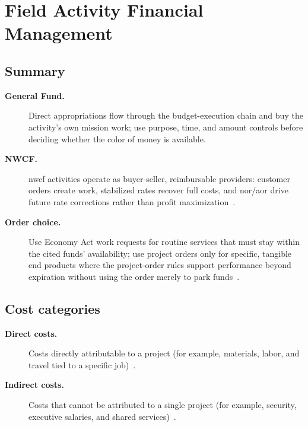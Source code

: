 \documentclass[../main.tex]{subfiles}
\begin{document}
\section{Field Activity Financial Management}

\subsection{Summary}
\begin{description}
  \item[\textbf{General Fund.}] Direct appropriations flow through the budget-execution chain and buy the activity's own
  mission work; use purpose, time, and amount controls before deciding whether the color of money is available.
  \item[\textbf{NWCF.}] \ac{nwcf} activities operate as buyer-seller, reimbursable providers: customer orders create work,
  stabilized rates recover full costs, and \ac{nor}/\ac{aor} drive future rate corrections rather than profit
  maximization~\autocite{USC-2208-NWCF,DoDFMR-Vol11B-Ch1,DoDFMR-Vol11B-Ch3}.
  \item[\textbf{Order choice.}] Use Economy Act work requests for routine services that must stay within the cited funds'
  availability; use project orders only for specific, tangible end products where the project-order rules support
  performance beyond expiration without using the order merely to park funds~\autocite{DoDFMR-Vol11A-Ch2,DoDFMR-Vol11A-Ch3}.
\end{description}

\subsection{Cost categories}
\begin{description}
  \item[\textbf{Direct costs.}] Costs directly attributable to a project (for example, materials, labor, and travel tied to a specific job)~\autocite{edo-3-1-5-field-activity-fm-2025}.
  \item[\textbf{Indirect costs.}] Costs that cannot be attributed to a single project (for example, security, executive salaries, and shared services)~\autocite{edo-3-1-5-field-activity-fm-2025}.
\end{description}
\end{document}
